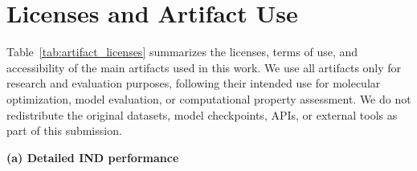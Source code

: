 \documentclass[11pt]{article}
\begin{document}
\section{Licenses and Artifact Use}
\label{appendix:licenses}
Table~\ref{tab:artifact_licenses} summarizes the licenses, terms of use, and accessibility of the main artifacts used in this work. We use all artifacts only for research and evaluation purposes, following their intended use for molecular optimization, model evaluation, or computational property assessment. We do not redistribute the original datasets, model checkpoints, APIs, or external tools as part of this submission.


\begin{table}[t]

\centering
\footnotesize
\setlength{\tabcolsep}{1.8pt}
\renewcommand{\arraystretch}{1.18}

\textbf{(a) Detailed IND performance}
\vspace{2pt}

\end{table}
\end{document}
